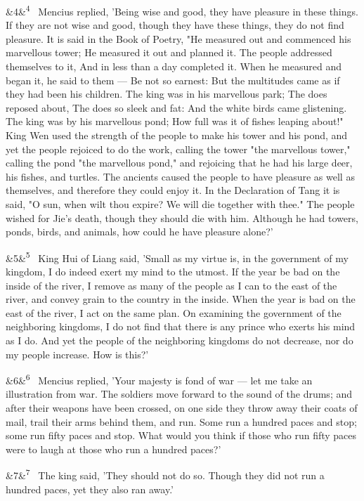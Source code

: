 \documentclass[12pt]{article}
\newcommand{\para}[1][]{\par\noindent\ifx&#1&\else\textsuperscript{\footnotesize #1}~\fi}
\begin{document}
\para[4] Mencius replied, 'Being wise and good, they have pleasure in these things. If they are not wise and good, though they have these things, they do not find pleasure. It is said in the Book of Poetry, "He measured out and commenced his marvellous tower; He measured it out and planned it. The people addressed themselves to it, And in less than a day completed it. When he measured and began it, he said to them --- Be not so earnest: But the multitudes came as if they had been his children. The king was in his marvellous park; The does reposed about, The does so sleek and fat: And the white birds came glistening. The king was by his marvellous pond; How full was it of fishes leaping about!" King Wen used the strength of the people to make his tower and his pond, and yet the people rejoiced to do the work, calling the tower "the marvellous tower," calling the pond "the marvellous pond," and rejoicing that he had his large deer, his fishes, and turtles. The ancients caused the people to have pleasure as well as themselves, and therefore they could enjoy it. In the Declaration of Tang it is said, "O sun, when wilt thou expire? We will die together with thee." The people wished for Jie's death, though they should die with him. Although he had towers, ponds, birds, and animals, how could he have pleasure alone?'

\para[5] King Hui of Liang said, 'Small as my virtue is, in the government of my kingdom, I do indeed exert my mind to the utmost. If the year be bad on the inside of the river, I remove as many of the people as I can to the east of the river, and convey grain to the country in the inside. When the year is bad on the east of the river, I act on the same plan. On examining the government of the neighboring kingdoms, I do not find that there is any prince who exerts his mind as I do. And yet the people of the neighboring kingdoms do not decrease, nor do my people increase. How is this?'

\para[6] Mencius replied, 'Your majesty is fond of war --- let me take an illustration from war. The soldiers move forward to the sound of the drums; and after their weapons have been crossed, on one side they throw away their coats of mail, trail their arms behind them, and run. Some run a hundred paces and stop; some run fifty paces and stop. What would you think if those who run fifty paces were to laugh at those who run a hundred paces?'

\para[7] The king said, 'They should not do so. Though they did not run a hundred paces, yet they also ran away.'
\end{document}
